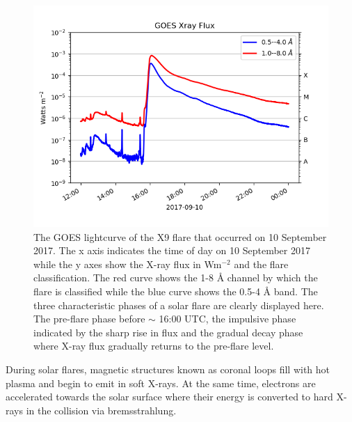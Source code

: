 \begin{figure}[ht]
    \centering
    \includegraphics[width=\columnwidth]{Images/GOES_Xclass.png}
    \caption[GOES lightcurve for X9 class flare on 10 September 2017.]{The GOES lightcurve of the X9 flare that occurred on 10 September 2017. The x axis indicates the time of day on 10 September 2017 while the y axes show the X-ray flux in Wm$^{-2}$ and the flare classification. The red curve shows the 1-8 {\AA} channel by which the flare is classified while the blue curve shows the 0.5-4 {\AA} band. The three characteristic phases of a solar flare are clearly displayed here. The pre-flare phase before $\sim$ 16:00 UTC, the impulsive phase indicated by the sharp rise in flux and the gradual decay phase where X-ray flux gradually returns to the pre-flare level.}
    \label{fig:GOES_Xclass}
\end{figure}
During solar flares, magnetic structures known as coronal loops fill with hot plasma and begin to emit in soft X-rays. At the same time, electrons are accelerated towards the solar surface where their energy is converted to hard X-rays in the collision via bremsstrahlung. 

